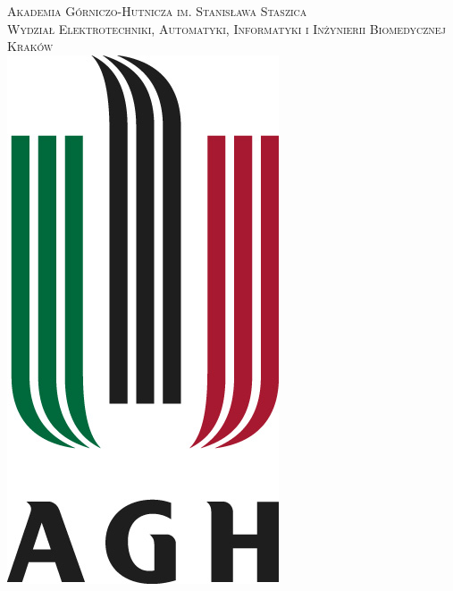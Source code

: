 \documentclass[a4paper, 11pt]{article}
\begin{document}
	
	\begin{titlepage}
		
		
		
		\newcommand{\HRule}{\rule{\linewidth}{0.5mm}} %
		
		\center %
		
		
		\textsc{\LARGE Akademia Górniczo-Hutnicza im. Stanisława Staszica}\\ %
		\textsc{\Large Wydział Elektrotechniki, Automatyki, Informatyki i Inżynierii Biomedycznej}\\[0.5cm] %
		\textsc{\Large Kraków}\\[0.5cm] %
		\hfill\includegraphics[scale=0.5]{Img/logoAgh.jpg}\hspace*{\fill}
		

\end{titlepage}
\end{document}
